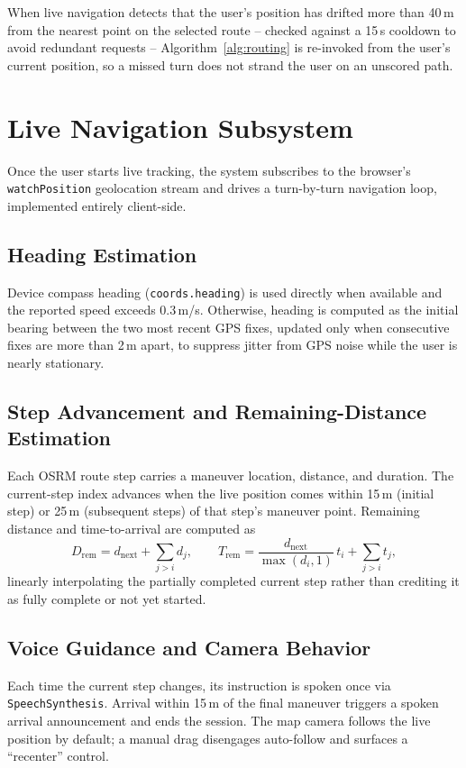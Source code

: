 \documentclass[conference]{IEEEtran}
\begin{document}
When live navigation detects that the user's position has drifted more than 40\,m from the nearest point on the selected route -- checked against a 15\,s cooldown to avoid redundant requests -- Algorithm~\ref{alg:routing} is re-invoked from the user's current position, so a missed turn does not strand the user on an unscored path.

\section{Live Navigation Subsystem}
\label{sec:nav}

Once the user starts live tracking, the system subscribes to the browser's \texttt{watchPosition} geolocation stream and drives a turn-by-turn navigation loop, implemented entirely client-side.

\subsection{Heading Estimation}
Device compass heading (\texttt{coords.heading}) is used directly when available and the reported speed exceeds 0.3\,m/s. Otherwise, heading is computed as the initial bearing between the two most recent GPS fixes, updated only when consecutive fixes are more than 2\,m apart, to suppress jitter from GPS noise while the user is nearly stationary.

\subsection{Step Advancement and Remaining-Distance Estimation}
Each OSRM route step carries a maneuver location, distance, and duration. The current-step index advances when the live position comes within 15\,m (initial step) or 25\,m (subsequent steps) of that step's maneuver point. Remaining distance and time-to-arrival are computed as
\begin{equation}
D_{\text{rem}} = d_{\text{next}} + \sum_{j>i} d_j, \qquad
T_{\text{rem}} = \frac{d_{\text{next}}}{\max(d_i,1)}\,t_i + \sum_{j>i} t_j,
\end{equation}
linearly interpolating the partially completed current step rather than crediting it as fully complete or not yet started.

\subsection{Voice Guidance and Camera Behavior}
Each time the current step changes, its instruction is spoken once via \texttt{SpeechSynthesis}. Arrival within 15\,m of the final maneuver triggers a spoken arrival announcement and ends the session. The map camera follows the live position by default; a manual drag disengages auto-follow and surfaces a ``recenter'' control.
\end{document}
